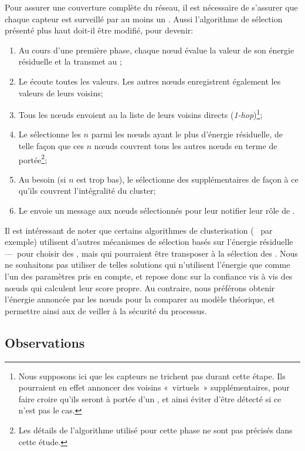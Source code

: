 Pour assurer une couverture complète du réseau, il est nécessaire de s'assurer que chaque capteur est surveillé par au moins un \cn.
Aussi l'algorithme de sélection présenté plus haut doit-il être modifié, pour devenir:
\begin{enumerate}
    \item Au cours d'une première phase, chaque nœud évalue la valeur de son énergie résiduelle et la transmet au \ch;
    \item Le \ch écoute toutes les valeurs. Les autres nœuds enregistrent également les valeurs de leurs voisins;
    \item Tous les nœuds envoient au \CH la liste de leurs voisins directs (\textit{1-hop})\footnote{Nous supposons ici que les capteurs ne trichent pas durant cette étape. Ils pourraient en effet annoncer des voisins « virtuels » supplémentaires, pour faire croire qu'ils seront à portée d'un \cn, et ainsi éviter d'être détecté si ce n'est pas le cas.};
    \item Le \CH sélectionne les $n$ \cns parmi les nœuds ayant le plus d'énergie résiduelle, de telle façon que ces $n$ nœuds couvrent tous les autres nœuds en terme de portée\footnote{Les détails de l'algorithme utilisé pour cette phase ne sont pas précisés dans cette étude.};
    \item Au besoin (si $n$ est trop bas), le \CH sélectionne des \cns supplémentaires de façon à ce qu'ils couvrent l'intégralité du cluster;
    \item Le \CH envoie un message aux nœuds sélectionnés pour leur notifier leur rôle de \cn.
\end{enumerate}

Il est intéressant de noter que certains algorithmes de clusterisation (\heed~\cite{YF04} par exemple) utilisent d'autres mécanismes de sélection basés sur l'énergie résiduelle ---~pour choisir des \chs, mais qui pourraient être transposer à la sélection des \cns.
Nous ne souhaitons pas utiliser de telles solutions qui n'utilisent l'énergie que comme l'un des paramètres pris en compte, et repose donc sur la confiance vis à vis des nœuds qui calculent leur score propre.
Au contraire, nous préférons obtenir l'énergie annoncée par les nœuds pour la comparer au modèle théorique, et permettre ainsi aux \vns de veiller à la sécurité du processus.

    \subsection{Observations}


